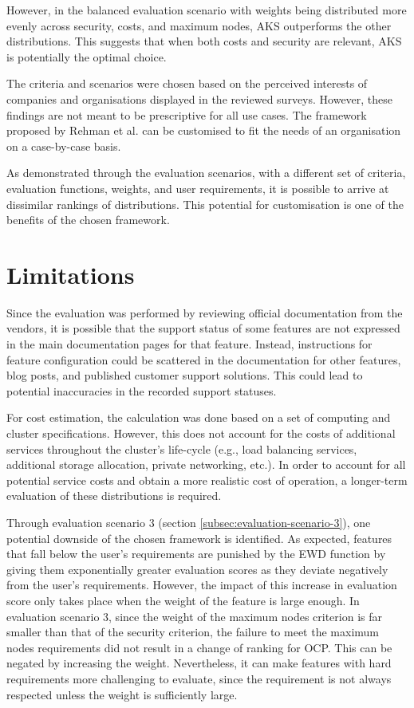 However, in the balanced evaluation scenario with weights being distributed more evenly across security, costs, and maximum nodes, AKS outperforms the other distributions. This suggests that when both costs and security are relevant, AKS is potentially the optimal choice.

The criteria and scenarios were chosen based on the perceived interests of companies and organisations displayed in the reviewed surveys. However, these findings are not meant to be prescriptive for all use cases. The framework proposed by Rehman et al. \cite{5976164} can be customised to fit the needs of an organisation on a case-by-case basis.

As demonstrated through the evaluation scenarios, with a different set of criteria, evaluation functions, weights, and user requirements, it is possible to arrive at dissimilar rankings of distributions. This potential for customisation is one of the benefits of the chosen framework.

\section{Limitations}

Since the evaluation was performed by reviewing official documentation from the vendors, it is possible that the support status of some features are not expressed in the main documentation pages for that feature. Instead, instructions for feature configuration could be scattered in the documentation for other features, blog posts, and published customer support solutions. This could lead to potential inaccuracies in the recorded support statuses.

For cost estimation, the calculation was done based on a set of computing and cluster specifications. However, this does not account for the costs of additional services throughout the cluster's life-cycle (e.g., load balancing services, additional storage allocation, private networking, etc.). In order to account for all potential service costs and obtain a more realistic cost of operation, a longer-term evaluation of these distributions is required.

Through evaluation scenario 3 (section \ref{subsec:evaluation-scenario-3}), one potential downside of the chosen framework is identified. As expected, features that fall below the user's requirements are punished by the EWD function by giving them exponentially greater evaluation scores as they deviate negatively from the user's requirements. However, the impact of this increase in evaluation score only takes place when the weight of the feature is large enough. In evaluation scenario 3, since the weight of the maximum nodes criterion is far smaller than that of the security criterion, the failure to meet the maximum nodes requirements did not result in a change of ranking for OCP. This can be negated by increasing the weight. Nevertheless, it can make features with hard requirements more challenging to evaluate, since the requirement is not always respected unless the weight is sufficiently large.

